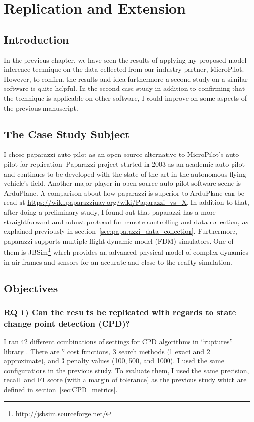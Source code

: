 \chapter{Replication and Extension}

\section{Introduction}

In the previous chapter, we have seen the results of applying my proposed model inference technique on the data collected from our industry partner, MicroPilot. However, to confirm the results and idea furthermore a second study on a similar software is quite helpful. In the second case study in addition to confirming that the technique is applicable on other software, I could improve on some aspects of the previous manuscript.


\section{The Case Study Subject}
I chose paparazzi auto pilot as an open-source alternative to MicroPilot's auto-pilot for replication. Paparazzi \cite{hattenberger2014using} project started in 2003 as an academic auto-pilot and continues to be developed with the state of the art in the autonomous flying vehicle's field. Another major player in open source auto-pilot software scene is ArduPlane. A comparison about how paparazzi is superior to ArduPlane can be read at \url{https://wiki.paparazziuav.org/wiki/Paparazzi_vs_X}. 
In addition to that, after doing a preliminary study, I found out that paparazzi has a more straightforward and robust protocol for remote controlling and data collection, as explained previously in section~\ref{sec:paparazzi_data_collection}. 
Furthermore, paparazzi supports multiple flight dynamic model (FDM) simulators. One of them is JBSim\footnote{\url{http://jsbsim.sourceforge.net/}} which provides an advanced physical model of complex dynamics in air-frames and sensors for an accurate and close to the reality simulation. 


\section{Objectives}
\subsection{RQ 1) Can the results be replicated with regards to state change point detection (CPD)?}
I ran 42 different combinations of settings for CPD algorithms in ``ruptures'' library \cite{Truong2018ChangePointSurvey}. 
There are 7 cost functions, 3 search methods (1 exact and 2 approximate), and 3 penalty values (100, 500, and 1000).
I used the same configurations in the previous study. 
To evaluate them, I used the same precision, recall, and F1 score (with a margin of tolerance) as the previous study which are defined in section~\ref{sec:CPD_metrics}.

